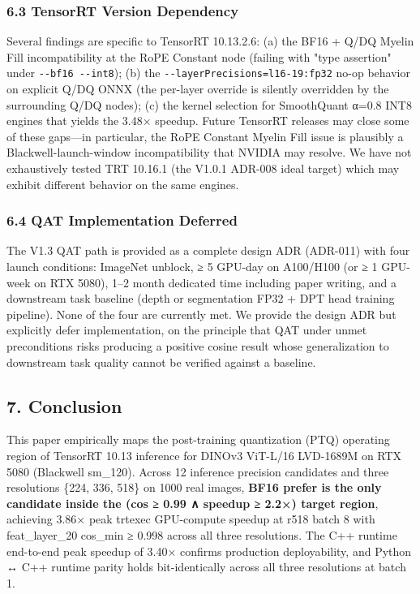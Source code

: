\documentclass[
]{article}
\begin{document}
\subsubsection{6.3 TensorRT Version
Dependency}\label{63-tensorrt-version-dependency}

Several findings are specific to TensorRT 10.13.2.6: (a) the BF16 + Q/DQ
Myelin Fill incompatibility at the RoPE Constant node (failing with
"type assertion" under \texttt{-\/-bf16\ -\/-int8}); (b) the
\texttt{-\/-layerPrecisions=l16-19:fp32} no-op behavior on explicit Q/DQ
ONNX (the per-layer override is silently overridden by the surrounding
Q/DQ nodes); (c) the kernel selection for SmoothQuant α=0.8 INT8 engines
that yields the 3.48× speedup. Future TensorRT releases may close some
of these gaps---in particular, the RoPE Constant Myelin Fill issue is
plausibly a Blackwell-launch-window incompatibility that NVIDIA may
resolve. We have not exhaustively tested TRT 10.16.1 (the V1.0.1 ADR-008
ideal target) which may exhibit different behavior on the same engines.

\subsubsection{6.4 QAT Implementation
Deferred}\label{64-qat-implementation-deferred}

The V1.3 QAT path is provided as a complete design ADR (ADR-011) with
four launch conditions: ImageNet unblock, ≥ 5 GPU-day on A100/H100 (or ≥
1 GPU-week on RTX 5080), 1--2 month dedicated time including paper
writing, and a downstream task baseline (depth or segmentation FP32 +
DPT head training pipeline). None of the four are currently met. We
provide the design ADR but explicitly defer implementation, on the
principle that QAT under unmet preconditions risks producing a positive
cosine result whose generalization to downstream task quality cannot be
verified against a baseline.

\subsection{7. Conclusion}\label{7-conclusion}

This paper empirically maps the post-training quantization (PTQ)
operating region of TensorRT 10.13 inference for DINOv3 ViT-L/16
LVD-1689M on RTX 5080 (Blackwell sm\_120). Across 12 inference precision
candidates and three resolutions \{224, 336, 518\} on 1000 real images,
\textbf{BF16 prefer is the only candidate inside the (cos ≥ 0.99 ∧
speedup ≥ 2.2×) target region}, achieving 3.86× peak trtexec GPU-compute
speedup at r518 batch 8 with feat\_layer\_20 cos\_min ≥ 0.998 across all
three resolutions. The C++ runtime end-to-end peak speedup of 3.40×
confirms production deployability, and Python ↔ C++ runtime parity holds
bit-identically across all three resolutions at batch 1.
\end{document}
